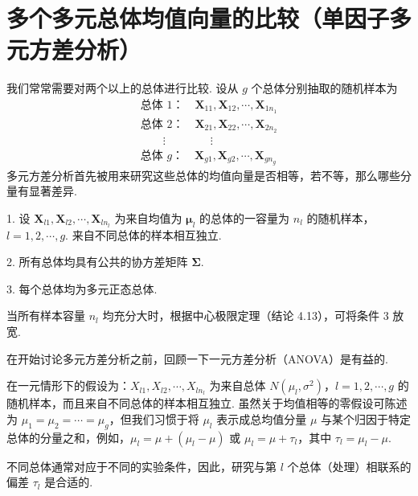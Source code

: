 \section{多个多元总体均值向量的比较（单因子多元方差分析）}  %
\label{sec:6.4}

我们常常需要对两个以上的总体进行比较. 设从 $g$ 个总体分别抽取的随机样本为
\label{eq:6-31}
\begin{equation}
\begin{array}{l}
\text{总体 } 1\text{：}\quad \mathbf{X}_{11},\mathbf{X}_{12},\cdots,\mathbf{X}_{1n_1}\\
\text{总体 } 2\text{：}\quad \mathbf{X}_{21},\mathbf{X}_{22},\cdots,\mathbf{X}_{2n_2}\\
\qquad\vdots\qquad\qquad\vdots\\
\text{总体 } g\text{：}\quad \mathbf{X}_{g1},\mathbf{X}_{g2},\cdots,\mathbf{X}_{gn_g}
\end{array}
\tag{6-31}
\end{equation}
多元方差分析首先被用来研究这些总体的均值向量是否相等，若不等，那么哪些分量有显著差异.


1. 设 $\mathbf{X}_{l1},\mathbf{X}_{l2},\cdots,\mathbf{X}_{ln_l}$ 为来自均值为 $\boldsymbol{\mu}_l$ 的总体的一容量为 $n_l$ 的随机样本，$l=1,2,\cdots,g$. 来自不同总体的样本相互独立.

2. 所有总体均具有公共的协方差矩阵 $\boldsymbol{\Sigma}$.

3. 每个总体均为多元正态总体.

当所有样本容量 $n_l$ 均充分大时，根据中心极限定理（结论 4.13），可将条件 3 放宽.

在开始讨论多元方差分析之前，回顾一下一元方差分析（ANOVA）是有益的.


在一元情形下的假设为：$X_{l1},X_{l2},\cdots,X_{ln_l}$ 为来自总体 $N(\mu_l,\sigma^2)$，$l=1,2,\cdots,g$ 的随机样本，而且来自不同总体的样本相互独立. 虽然关于均值相等的零假设可陈述为 $\mu_1=\mu_2=\cdots=\mu_g$，但我们习惯于将 $\mu_l$ 表示成总均值分量 $\mu$ 与某个归因于特定总体的分量之和，例如，$\mu_l=\mu+(\mu_l-\mu)$ 或 $\mu_l=\mu+\tau_l$，其中 $\tau_l=\mu_l-\mu$.

不同总体通常对应于不同的实验条件，因此，研究与第 $l$ 个总体（处理）相联系的偏差 $\tau_l$ 是合适的.

